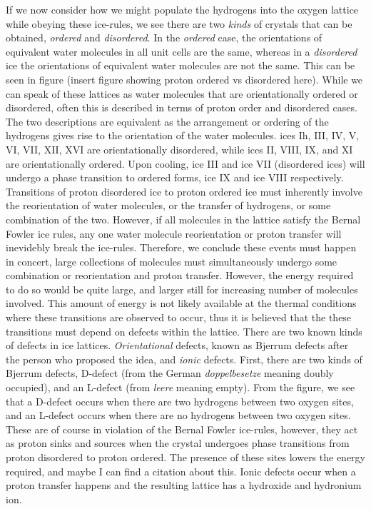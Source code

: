 If we now consider how we might populate the hydrogens into the oxygen
lattice while obeying these ice-rules, we see there are two
\textit{kinds} of crystals that can be obtained, \textit{ordered} and
\textit{disordered}. In the \textit{ordered} case, the orientations of
equivalent water molecules in all unit cells are the same, whereas in
a \textit{disordered} ice the orientations of equivalent water
molecules are not the same. This can be seen in figure (insert figure
showing proton ordered vs disordered here). While we can speak of
these lattices as water molecules that are orientationally ordered or
disordered, often this is described in terms of proton order and
disordered cases. The two descriptions are equivalent as the
arrangement or ordering of the hydrogens gives rise to the orientation
of the water molecules. ices Ih, III, IV, V, VI, VII, XII, XVI are
orientationally disordered, while ices II, VIII, IX, and XI are
orientationally ordered. Upon cooling, ice III and ice VII (disordered
ices) will undergo a phase transition to ordered forms, ice IX and ice
VIII respectively. Transitions of proton disordered ice to proton
ordered ice must inherently involve the reorientation of water
molecules, or the transfer of hydrogens, or some combination of the
two. However, if all molecules in the lattice satisfy the Bernal
Fowler ice rules, any one water molecule reorientation or proton
transfer will inevidebly break the ice-rules. Therefore, we conclude
these events must happen in concert, large collections of molecules
must simultaneously undergo some combination or reorientation and
proton transfer. However, the energy required to do so would be quite
large, and larger still for increasing number of molecules
involved. This amount of energy is not likely available at the thermal
conditions where these transitions are observed to occur, thus it is
believed that the these transitions must depend on defects within the
lattice. There are two known kinds of defects in ice
lattices. \textit{Orientational} defects, known as Bjerrum defects after the
person who proposed the idea, and \textit{ionic} defects. First, there
are two kinds of Bjerrum defects, D-defect (from the German
\textit{doppelbesetze} meaning doubly occupied), and an L-defect (from
\textit{leere} meaning empty). From the figure, we see that a D-defect
occurs when there are two hydrogens between two oxygen sites, and an
L-defect occurs when there are no hydrogens between two oxygen
sites. These are of course in violation of the Bernal Fowler
ice-rules, however, they act as proton sinks and sources when the
crystal undergoes phase transitions from proton disordered to proton
ordered. The presence of these sites lowers the energy required, and
maybe I can find a citation about this. Ionic defects occur when a
proton transfer happens and the resulting lattice has a hydroxide and
hydronium ion.



